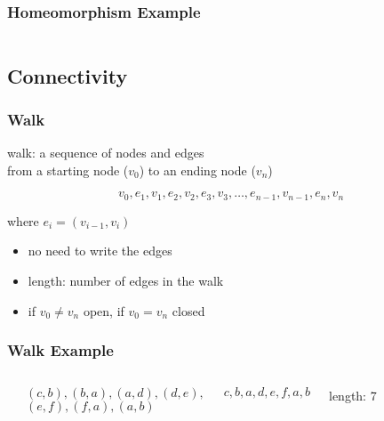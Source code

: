 \documentclass[dvipsnames]{beamer}
\begin{document}
\begin{frame}
  \frametitle{Homeomorphism Example}

  \begin{example}
    \begin{columns}
      \begin{center}
      \end{center}

      \begin{center}
      \end{center}
    \end{columns}
  \end{example}
\end{frame}

\subsection{Connectivity}

\begin{frame}
  \frametitle{Walk}

  \begin{definition}
    \alert{walk}: a sequence of nodes and edges\\
      from a starting node ($v_0$) to an ending node ($v_n$)

    \[
      v_0,e_1,v_1,e_2,v_2,e_3,v_3,\dots,e_{n-1},v_{n-1},e_n,v_n
    \]

    where $e_i=(v_{i-1},v_i)$
  \end{definition}

  \pause
  \begin{itemize}
    \item no need to write the edges

    \pause
    \medskip
    \item \alert{length}: number of edges in the walk
    \item if $v_0 \neq v_n$ \alert{open}, if $v_0 = v_n$ \alert{closed}
  \end{itemize}
\end{frame}

\begin{frame}
  \frametitle{Walk Example}

  \begin{example}
    \begin{columns}
      \begin{center}
      \end{center}

      $(c,b),(b,a),(a,d),(d,e),$\\
      $(e,f),(f,a),(a,b)$

      \medskip
      $c,b,a,d,e,f,a,b$

      \bigskip
      length: 7
    \end{columns}
  \end{example}
\end{frame}
\end{document}
